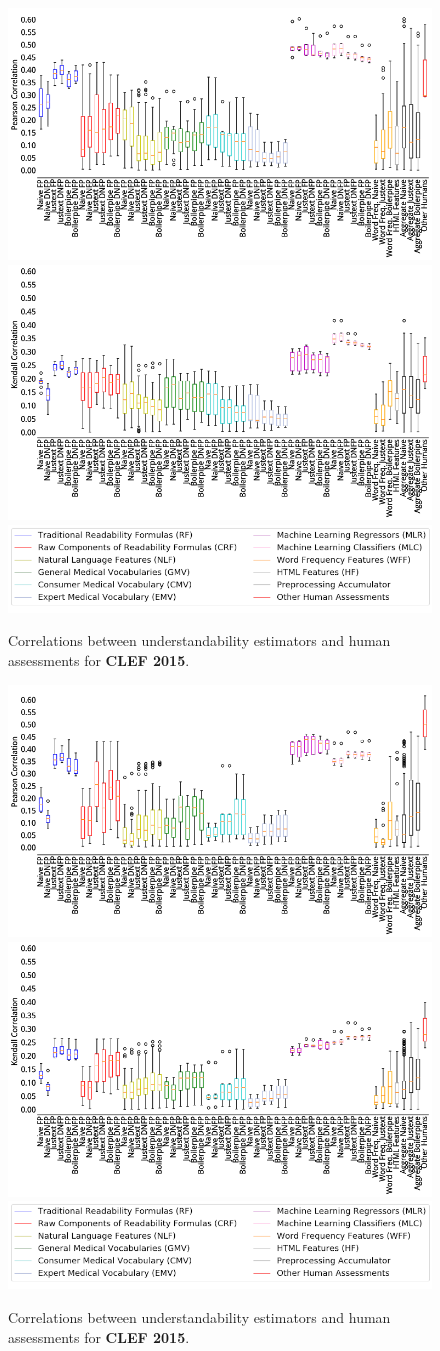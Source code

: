\documentclass[10pt,a4paper]{article}
\begin{document}
\begin{figure}[h!]
	\centering
	\includegraphics[width=.6\textwidth]{appendix/box_pearson15_raw_values}
    \includegraphics[width=.6\textwidth]{appendix/box_kendalltau15_raw_values}
	\includegraphics[width=.6\textwidth]{appendix/legendCorr}
    \caption{Correlations between understandability estimators and human assessments for \textbf{CLEF 2015}.}
	\label{fig:dist}
\end{figure}

\begin{figure}[h!]
	\centering
	\includegraphics[width=.6\textwidth]{appendix/box_pearson16_raw_values}
    \includegraphics[width=.6\textwidth]{appendix/box_kendalltau16_raw_values}
	\includegraphics[width=.6\textwidth]{appendix/legendCorr}
    \caption{Correlations between understandability estimators and human assessments for \textbf{CLEF 2015}.}
	\label{fig:dist}
\end{figure}
\end{document}
